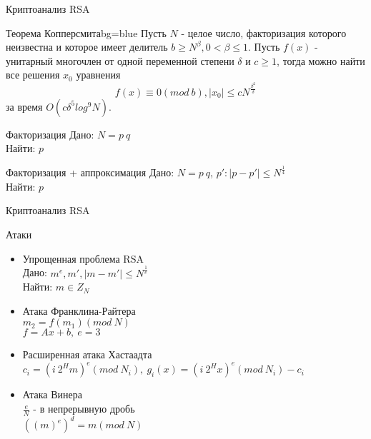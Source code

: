 \begin{frame}{Криптоанализ RSA}			

	\changefontsizes{10pt}

	\begin{importantblock}{Теорема Копперсмита}{}{bg=blue}
		Пусть $N$ - целое число, факторизация которого неизвестна и которое имеет делитель {$b \ge N^\beta, 0 < \beta \le 1$}. Пусть {$f(x)$} - 
		унитарный многочлен от одной переменной степени {$\delta$} и {$c \ge 1$}, тогда можно найти все решения {$x_0$} уравнения
		    \begin{equation}
		      f(x) \equiv 0(mod \: b), |x_0| \le c N^{\frac{\beta^2}{\delta}}
		    \end{equation}
		за время {$O(c \delta^5 log^9 N)$}.
	\end{importantblock}	 
	
	\begin{block}{Факторизация}
		Дано: $N = p \: q$ \\
		Найти: $p$
	\end{block}	

	\begin{block}{Факторизация + аппроксимация}
		Дано: $N = p \: q$, $p': |p-p'| \le N^\frac{1}{4}$ \\
		Найти: $p$
	\end{block}		 

	\changefontsizes{13pt}
	
\end{frame}

\begin{frame}{Криптоанализ RSA}	
	\begin{center}
		{\LARGE Атаки }

		\begin{itemize}
			\item Упрощенная проблема RSA \\
				Дано: {$m^e, m', |m-m'| \le N^\frac{1}{e}$} \\   
  				Найти: {$m \in Z_N$} 

			\item Атака Франклина-Райтера \\
				$m_2 = f(m_1)(mod \: N)$ \\
				$f = Ax+b, \: e = 3$
			\item Расширенная атака Хастаадта \\
				$c_i=(i \: 2^H m)^e(mod \: N_i), \: g_i(x) = (i \: 2^H x)^e(mod \: N_i) - c_i$
			\item Атака Винера \\
				$\frac{e}{N}$ - в непрерывную дробь \\
				$((m)^e)^d = m (mod \: N)$
		\end{itemize}
	\end{center}	
\end{frame}

